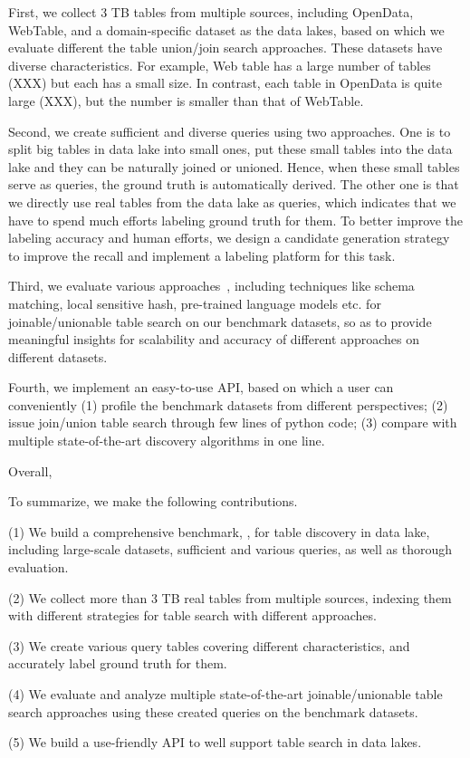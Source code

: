  First, we collect 3 TB tables from multiple sources, including OpenData, WebTable, and a domain-specific dataset as the data lakes, based on which we evaluate different the table union/join search approaches. These datasets have diverse characteristics. For example, Web table has a large number of tables (XXX) but each has a small size. In contrast, each table in OpenData is quite large (XXX), but the number is smaller than that of WebTable. 
 
 
Second, we create sufficient and diverse queries using two approaches. 
One is to split big tables in data lake into small ones, put these small tables into the data lake and they can be naturally joined or unioned. Hence, when these small tables serve as queries, the ground truth is automatically derived. 
The other one is that we directly use real tables from the data lake as queries, which indicates that we have to spend much efforts labeling ground truth for them.
To better improve the labeling accuracy and human efforts, we design a candidate generation strategy to improve the recall and implement a labeling platform for this task.   

Third, we evaluate various approaches~\cc{\cite{}}, including techniques like schema matching, local sensitive hash,  pre-trained language models etc. for joinable/unionable table search on our benchmark datasets, so as to provide meaningful insights for scalability and accuracy of different approaches on different datasets.

Fourth, we implement an easy-to-use API, based on which a user can conveniently (1) profile the benchmark datasets from different perspectives;
(2) issue join/union table search through few lines of python code;
(3) compare with multiple state-of-the-art discovery algorithms in one line. 

Overall, 

To summarize, we make the following contributions.

\noindent (1) We build a comprehensive benchmark, \sys, for table discovery in data lake, including large-scale datasets, sufficient and various queries, as well as thorough evaluation.  

\noindent (2) We collect more than 3 TB real tables from multiple sources, indexing them with different strategies for table search with different approaches.  

\noindent (3) We create various query tables covering different characteristics, and accurately label ground truth for them.

\noindent (4) We evaluate and analyze multiple state-of-the-art joinable/unionable table search approaches using these created queries on the benchmark datasets.

\noindent (5) We build a use-friendly API to well support table search in data lakes. 

  
